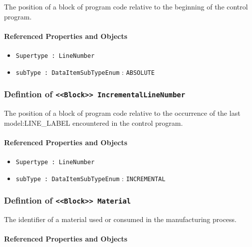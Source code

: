 \FloatBarrier

The position of a block of program code relative to the beginning of the control program.

\FloatBarrier
\paragraph{Referenced Properties and Objects}

\begin{itemize}
\item \texttt{Supertype : LineNumber}

\item \texttt{subType : DataItemSubTypeEnum} : \texttt{ABSOLUTE}

\end{itemize}
\FloatBarrier
\subsubsection{Defintion of \texttt{<<Block>> IncrementalLineNumber}}
  \label{type:IncrementalLineNumber}

\FloatBarrier

The position of a block of program code relative to the occurrence of the last {model:LINE_LABEL} encountered in the control program.

\FloatBarrier
\paragraph{Referenced Properties and Objects}

\begin{itemize}
\item \texttt{Supertype : LineNumber}

\item \texttt{subType : DataItemSubTypeEnum} : \texttt{INCREMENTAL}

\end{itemize}
\FloatBarrier
\subsubsection{Defintion of \texttt{<<Block>> Material}}
  \label{type:Material}

\FloatBarrier

The identifier of a material used or consumed in the manufacturing process.

\FloatBarrier
\paragraph{Referenced Properties and Objects}


